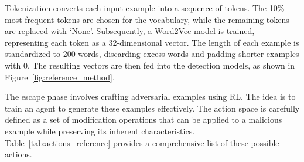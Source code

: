 \begin{table}[!h]
    \caption{Tokenization Rules}
    \centering
    \label{tab:tokenization_reference}
\end{table}



Tokenization converts each input example into a sequence of tokens. The 10\% most frequent tokens are chosen for the vocabulary, while the remaining tokens are replaced with `None'. Subsequently, a Word2Vec model is trained, representing each token as a 32-dimensional vector. The length of each example is standardized to 200 words, discarding excess words and padding shorter examples with 0. The resulting vectors are then fed into the detection models, as shown in Figure~\ref{fig:reference_method}.



The escape phase involves crafting adversarial examples using RL. The idea is to train an agent to generate these examples effectively. The action space is carefully defined as a set of modification operations that can be applied to a malicious example while preserving its inherent characteristics. Table~\ref{tab:actions_reference} provides a comprehensive list of these possible actions.



